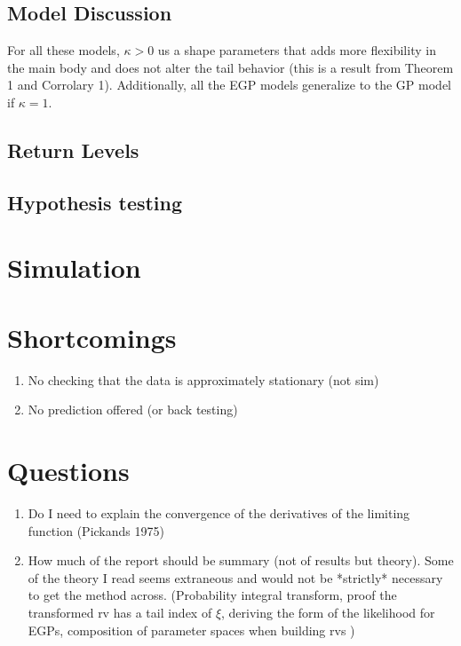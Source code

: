 \documentclass{article}
\theoremstyle{definition}
\theoremstyle{definition}
\def\k{\kappa}
\begin{document}
\subsection{Model Discussion}
For all these models, $\k>0$ us a shape parameters that adds more flexibility in the main body and does not alter the tail behavior (this is a result from Theorem 1 and Corrolary 1). Additionally, all the EGP models generalize to the GP model if $\k=1$.

\subsection{Return Levels}

\subsection{Hypothesis testing}

\section{Simulation}

\section{Shortcomings}
\begin{enumerate}
    \item No checking that the data is approximately stationary (not sim)
    \item No prediction offered (or back testing)
\end{enumerate}

\section{Questions}
\begin{enumerate}
    \item Do I need to explain the convergence of the derivatives of the limiting function (Pickands 1975)
    \item How much of the report should be summary (not of results but theory). Some of the theory I read seems extraneous and would not be *strictly* necessary to get the method across. (Probability integral transform, proof the transformed rv has a tail index of $\xi$, deriving the form of the likelihood for EGPs, composition of parameter spaces when building rvs )
\end{enumerate}
\end{document}
